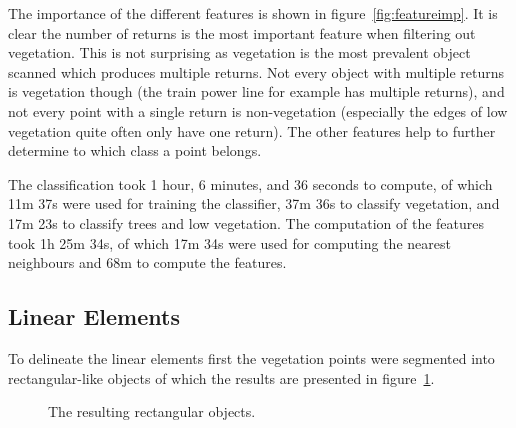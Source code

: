 The importance of the different features is shown in figure~\ref{fig:featureimp}. It is clear the number of returns is the most important feature when filtering out vegetation. This is not surprising as vegetation is the most prevalent object scanned which produces multiple returns. Not every object with multiple returns is vegetation though (the train power line for example has multiple returns), and not every point with a single return is non-vegetation (especially the edges of low vegetation quite often only have one return). The other features help to further determine to which class a point belongs.

The classification took 1 hour, 6 minutes, and 36 seconds to compute, of which 11m 37s were used for training the classifier, 37m 36s to classify vegetation, and 17m 23s to classify trees and low vegetation. The computation of the features took 1h 25m 34s, of which 17m 34s were used for computing the nearest neighbours and 68m to compute the features.

\subsection{Linear Elements}
To delineate the linear elements first the vegetation points were segmented into rectangular-like objects of which the results are presented in figure~\ref{fig:rect}.

\begin{figure}[!b]
	\centering
	\caption{The resulting rectangular objects.}
	\label{fig:rect}
\end{figure}

